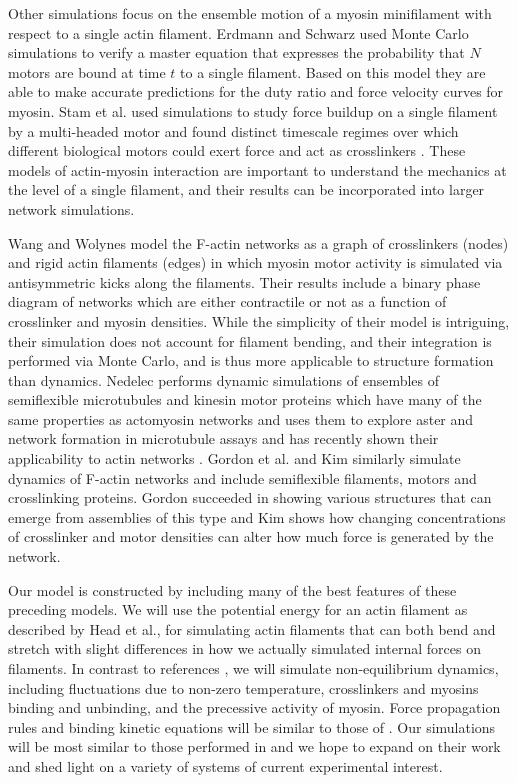 \documentclass[12pt]{article}
\begin{document}
\par
Other simulations focus on the ensemble motion of a myosin minifilament with respect to a single actin filament.  
Erdmann and Schwarz used Monte Carlo simulations to verify a master equation that expresses the probability that $N$ motors are 
bound at time $t$ to a single filament\cite{erdmann2012}. Based on this model they are able to make accurate predictions for 
the duty ratio and force velocity curves for myosin. Stam et al. used simulations to study force buildup on a single 
filament by a multi-headed motor and found
distinct timescale regimes over which different biological motors could exert force and act as crosslinkers
\cite{stam2015}. These models of actin-myosin interaction are important to understand the mechanics at
the level of a single filament, and their results can be incorporated into larger network simulations. 
\par
Wang and Wolynes \cite{wang2012} model the F-actin networks as a graph of crosslinkers (nodes) and rigid actin filaments
(edges) in which myosin motor activity is simulated via antisymmetric kicks along the filaments. Their results include a
binary phase diagram of networks which are either contractile or not as a function of crosslinker and myosin
densities. While the simplicity of their model is intriguing, their simulation does not account for filament bending, 
and their integration is performed via Monte Carlo, and is thus more applicable to structure formation than dynamics.
Nedelec performs dynamic simulations of ensembles of semiflexible microtubules and kinesin motor proteins
which have many of the same properties as actomyosin networks and uses them to explore aster and network formation in microtubule
assays \cite{nedelec2007} and has recently shown their applicability to actin networks \cite{ennomani2016}.
Gordon et al. \cite{gordon2012} and Kim \cite{kim2014} similarly simulate dynamics of F-actin networks and include
semiflexible filaments, motors and crosslinking proteins. Gordon succeeded in showing various structures that can emerge
from assemblies of this type and Kim shows how changing concentrations of crosslinker and motor densities can alter how
much force is generated by the network.
\par
Our model is constructed by including many of the best features of these preceding models.
We will use the potential energy for an actin filament as described by Head et al., for simulating actin filaments that can 
both bend and stretch with slight differences in how we actually simulated 
internal forces on filaments. In contrast to references \cite{head2003, dasanyake2011}, we will 
simulate non-equilibrium dynamics, including fluctuations due to non-zero temperature,  
crosslinkers and myosins binding and unbinding, and the precessive activity of myosin.  
Force propagation rules and binding kinetic equations will be similar to those of
\cite{nedelec2007, gordon2012}. Our simulations will be most similar to those
performed in \cite{kim2014, ennomani2016} and we hope to expand on
their work and shed light on a variety of systems of current experimental interest. 
\end{document}
